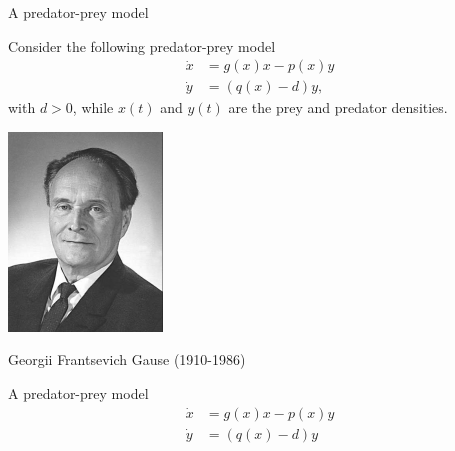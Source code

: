 \documentclass[usenames,dvipsnames,svgnames,10pt,aspectratio=169]{beamer}
\begin{document}
\begin{frame}[t, c]{A predator-prey model}{}
  \begin{minipage}{.68\textwidth}
    Consider the following predator-prey model
    \[
    \begin{aligned}
      \dot{x} & = g(x)x - p(x)y \\
      \dot{y} & = \left( q(x) - d \right)y,
    \end{aligned}
    \]
    with $d > 0$, while $x(t)$ and $y(t)$ are the prey and predator densities.
  \end{minipage}%
  \hfill
  \begin{minipage}{.28\textwidth}
    \centering
    \includegraphics[width=.8\textwidth]{gause}

    \bigskip
    \small
    Georgii Frantsevich Gause (1910-1986)
  \end{minipage}
\end{frame}

\begin{frame}[t, c]{A predator-prey model}{}
  \[
  \begin{aligned}
    \dot{x} & = g(x) x - p(x) y \\
    \dot{y} & = \left( q(x) - d \right) y
  \end{aligned}
  \]
\end{frame}
\end{document}
